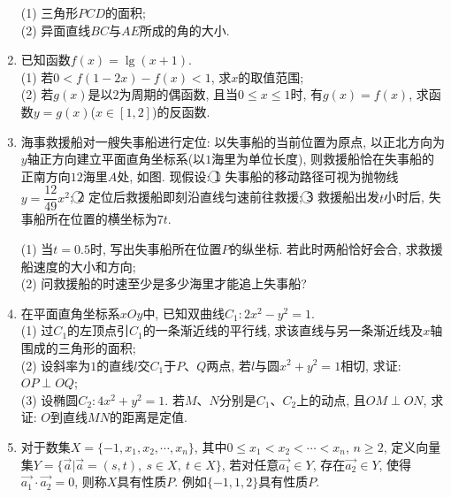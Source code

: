 \documentclass[10pt,a4paper]{article}
\begin{document}
\begin{enumerate}[1.]
\begin{center}
\begin{tikzpicture}[>=latex]
\end{tikzpicture}
\end{center}
(1) 三角形$PCD$的面积;\\
(2) 异面直线$BC$与$AE$所成的角的大小.
\item 已知函数$f(x)=\lg (x+1)$.\\
(1) 若$0<f(1-2x)-f(x)<1$, 求$x$的取值范围;\\
(2) 若$g(x)$是以$2$为周期的偶函数, 且当$0\le x\le 1$时, 有$g(x)=f(x)$, 求函数$y=g(x)$($x\in [1,2]$)的反函数.
\item 海事救援船对一艘失事船进行定位: 以失事船的当前位置为原点, 以正北方向为$y$轴正方向建立平面直角坐标系(以$1$海里为单位长度), 则救援船恰在失事船的正南方向$12$海里$A$处, 如图. 现假设: \textcircled{1} 失事船的移动路径可视为抛物线$y=\dfrac{12}{49}x^2$; \textcircled{2} 定位后救援船即刻沿直线匀速前往救援; \textcircled{3} 救援船出发$t$小时后, 失事船所在位置的横坐标为$7t$.
\begin{center}
\end{center}
(1) 当$t=0.5$时, 写出失事船所在位置$P$的纵坐标. 若此时两船恰好会合, 求救援船速度的大小和方向;\\
(2) 问救援船的时速至少是多少海里才能追上失事船?
\item 在平面直角坐标系$xOy$中, 已知双曲线$C_1:2x^2-y^2=1$.\\
(1) 过$C_1$的左顶点引$C_1$的一条渐近线的平行线, 求该直线与另一条渐近线及$x$轴围成的三角形的面积;\\
(2) 设斜率为$1$的直线$l$交$C_1$于$P$、$Q$两点, 若$l$与圆$x^2+y^2=1$相切, 求证: $OP\perp OQ$;\\
(3) 设椭圆$C_2:4x^2+y^2=1$. 若$M$、$N$分别是$C_1$、$C_2$上的动点, 且$OM\perp ON$, 求证: $O$到直线$MN$的距离是定值.
\item 对于数集$X=\{-1,x_1,x_2,\cdots,x_n\}$, 其中$0\le x_1<x_2<\cdots<x_n$, $n\ge 2$, 定义向量集$Y=\{\overrightarrow{a}|\overrightarrow{a} = (s,t), \ s\in X, \ t\in X\}$, 若对任意$\overrightarrow{a_1}\in Y$, 存在$\overrightarrow{a_2} \in Y$, 使得$\overrightarrow{a_1}\cdot \overrightarrow{a_2}=0$, 则称$X$具有性质$P$. 例如$\{-1,1,2\}$具有性质$P$.\\

\end{enumerate}
\end{document}
